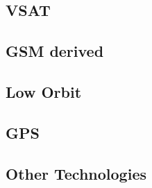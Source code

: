 \subsection{VSAT}
\label{vsat}

\subsection{GSM derived}
\label{gsmderived}

\subsection{Low Orbit}
\label{loworbit}

\subsection{GPS}
\label{gps}

\subsection{Other Technologies}
\label{othertechnologies}
